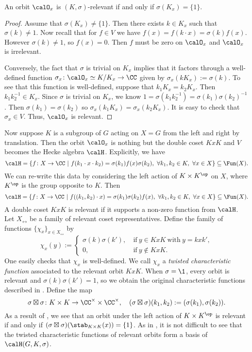 \begin{lem}\label{lemma: relevant_orbit}
    An orbit $\calO_x$ is $(K,\sigma)$-relevant if and only if $\sigma(K_x) = \{1\}$.
\end{lem}
\begin{proof}
    Assume that $\sigma(K_x)\neq\{1\}$.
    Then there exists $k\in K_x$  such that $\sigma(k)\neq 1$.
    Now recall that for $f\in V$ we have $f(x) = f(k\cdot x) = \sigma(k)f(x)$.
    However $\sigma(k)\neq 1$, so $f(x)=0$.
    Then $f$ must be zero on $\calO_x$ and $\calO_x$ is irrelevant.

    Conversely, the fact that $\sigma$ is trivial on $K_x$ implies that it factors through a well-defined function $\sigma_x\colon \calO_x\simeq K/K_x\rightarrow \CC$ given by $\sigma_x(kK_x) := \sigma(k)$.
    To see that this function is well-defined, suppose that $k_1K_x=k_2K_x$.
    Then $k_1k_2^{-1}\in K_x$.
    Since $\sigma$ is trivial on $K_x$, we know $1=\sigma(k_1k_2^{-1})=\sigma(k_1)\sigma(k_2)^{-1}$.
    Then $\sigma(k_1)=\sigma(k_2)$ so $\sigma_x(k_1K_x) = \sigma_x(k_2K_x)$.
    It is easy to check that $\sigma_x\in V$.
    Thus, $\calO_x$ is relevant.
\end{proof}
Now suppose $K$ is a subgroup of $G$ acting on $X=G$ from the left and right by translation.
Then the orbit $\calO_x$ is nothing but the double coset $KxK$ and $V$ becomes the Hecke algebra $\calH$.
Explicitly, we have
\[
    \calH = \{f\colon X\to\CC \ |\ f(k_1\cdot x \cdot k_2) = \sigma(k_1)f(x)\sigma(k_2),\ \forall k_1,k_2\in K,\ \forall x\in X\}\subseteq \Fun(X).
\]
We can re-write this data by considering the left action of $K\times K^\op$ on $X$, where $K^\op$ is the group opposite to $K$.
Then
\[
    \calH = \{f\colon X\to\CC \ |\ f((k_1,k_2)\cdot x) = \sigma(k_1)\sigma(k_2)f(x),\ \forall k_1,k_2\in K,\ \forall x\in X\}\subseteq\Fun(X).
\]
A double coset $KxK$ is relevant if it supports a non-zero function from $\calH$.
Let $X_\rel$ be a family of relevant coset representatives.
Define the family of functions $\{\chi_x\}_{x\in X_\rel}$ by
\[
    \chi_x(y) := \begin{cases}
        \sigma(k)\sigma(k'),\  & \text{if}\ y\in KxK\ \text{with}\ y=kxk', \\
        0,\                    & \text{if}\ y\notin KxK.
    \end{cases}
\]
One easily checks that $\chi_x$ is well-defined.
We call $\chi_x$ a \emph{twisted characteristic function} associated to the relevant orbit $KxK$.
When $\sigma=\1$, every orbit is relevant and $\sigma(k)\sigma(k')=1$, so we obtain the original characteristic functions described in .
Define the map
\[
    \sigma\boxtimes\sigma\colon K\times K\to\CC^\times\times\CC^\times,\quad (\sigma\boxtimes\sigma)(k_1,k_2) := (\sigma(k_1),\sigma(k_2)).
\]
As a result of , we see that an orbit under the left action of $K\times K^\op$ is relevant if and only if $(\sigma\boxtimes\sigma)(\stab_{K\times K}(x)) = \{1\}$.
As in , it is not difficult to see that the twisted characteristic functions of relevant orbits form a basis of $\calH(G,K,\sigma)$.

